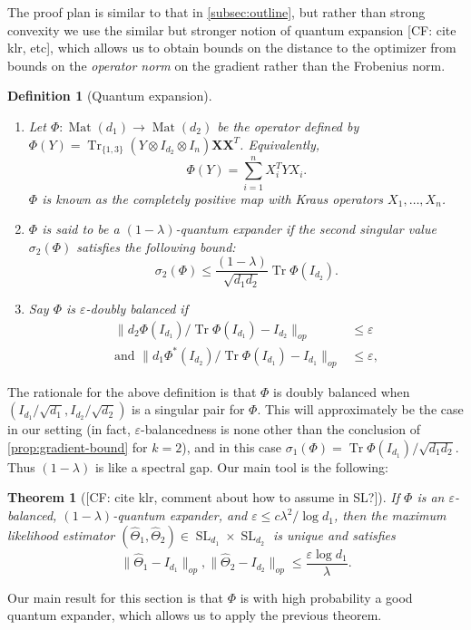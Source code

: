 \documentclass{article}
\newtheorem{theorem}{Theorem}
\newtheorem{definition}{Definition}
\newcommand{\ot}{\otimes}
\newcommand{\mat}{\operatorname{Mat}}
\renewcommand{\vec}{\bm}
\newcommand\eps{\varepsilon}
\newcommand\SL{\operatorname{SL}}
\newcommand\tr{\operatorname{Tr}}
\newcommand{\CF}[1]{{\color{purple}[CF: #1]}}
\begin{document}
The proof plan is similar to that in \cref{subsec:outline}, but rather than strong convexity we use the similar but stronger notion of quantum expansion \CF{cite klr, etc}, which allows us to obtain bounds on the distance to the optimizer from bounds on the \emph{operator norm} on the gradient rather than the Frobenius norm.

\begin{definition}[Quantum expansion]
$ $
\begin{enumerate}
\item Let $\Phi:\mat(d_1) \to \mat(d_2)$ be the operator defined by $\Phi(Y) = \tr_{\{1,3\}} ( Y \ot I_{d_2} \ot I_{n}) \vec X \vec X^T$. Equivalently,
$$\Phi(Y) = \sum_{i = 1}^n X_i^T Y X_i.$$
$\Phi$ is known as the \emph{completely positive map} with Kraus operators $X_1, \dots, X_n$.
\item $\Phi$ is said to be a \emph{$(1 - \lambda)$-quantum expander} if the second singular value $\sigma_2(\Phi)$ satisfies the following bound:
$$\sigma_2(\Phi) \leq \frac{(1 - \lambda)}{\sqrt{d_1d_2}} \tr \Phi(I_{d_2}).$$
\item Say $\Phi$ is \emph{$\eps$-doubly balanced} if
\begin{align*}
\|d_2 \Phi(I_{d_1})/\tr \Phi(I_{d_1})  - I_{d_2} \|_{op}& \leq \eps\\
\textrm{and }\|d_1 \Phi^*(I_{d_2})/\tr \Phi(I_{d_1})  - I_{d_1}  \|_{op} & \leq \eps,
\end{align*}
\end{enumerate}
\end{definition}

The rationale for the above definition is that $\Phi$ is doubly balanced when $(I_{d_1}/\sqrt{d_1}, I_{d_2}/\sqrt{d_2})$ is a singular pair for $\Phi$. This will approximately be the case in our setting (in fact, $\eps$-balancedness is none other than the conclusion of \cref{prop:gradient-bound} for $k = 2$), and in this case $\sigma_1(\Phi) =  \tr \Phi(I_{d_1})/\sqrt{d_1 d_2}.$ Thus $(1-\lambda)$ is like a spectral gap.
Our main tool is the following:


\begin{theorem}[\CF{cite klr, comment about how to assume in SL?}]\label{thm:klr}
If $\Phi$ is an $\eps$-balanced, $(1 - \lambda)$-quantum expander, and $\eps \leq c \lambda^2/\log d_1$, then the maximum likelihood estimator $(\widehat{\Theta}_1, \widehat{\Theta}_2) \in \SL_{d_1}\times \SL_{d_2}$ is unique and satisfies
$$\| \widehat{\Theta}_1 - I_{d_1}\|_{op}, \| \widehat{\Theta}_2 - I_{d_2}\|_{op} \leq \frac{\eps \log d_1}{\lambda}.$$
\end{theorem}
Our main result for this section is that $\Phi$ is with high probability a good quantum expander, which allows us to apply the previous theorem.
\end{document}
